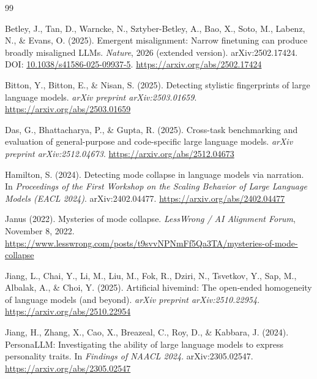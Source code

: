 \documentclass[11pt,a4paper]{article}
\begin{document}

\begin{thebibliography}{99}

Betley, J., Tan, D., Warncke, N., Sztyber-Betley, A., Bao, X., Soto, M., Labenz, N., \& Evans, O. (2025).
\newblock Emergent misalignment: Narrow finetuning can produce broadly misaligned LLMs.
\newblock \emph{Nature}, 2026 (extended version).
\newblock arXiv:2502.17424. DOI: \href{https://doi.org/10.1038/s41586-025-09937-5}{10.1038/s41586-025-09937-5}.
\newblock \url{https://arxiv.org/abs/2502.17424}

Bitton, Y., Bitton, E., \& Nisan, S. (2025).
\newblock Detecting stylistic fingerprints of large language models.
\newblock \emph{arXiv preprint arXiv:2503.01659}.
\newblock \url{https://arxiv.org/abs/2503.01659}

Das, G., Bhattacharya, P., \& Gupta, R. (2025).
\newblock Cross-task benchmarking and evaluation of general-purpose and code-specific large language models.
\newblock \emph{arXiv preprint arXiv:2512.04673}.
\newblock \url{https://arxiv.org/abs/2512.04673}

Hamilton, S. (2024).
\newblock Detecting mode collapse in language models via narration.
\newblock In \emph{Proceedings of the First Workshop on the Scaling Behavior of Large Language Models (EACL 2024)}.
\newblock arXiv:2402.04477.
\newblock \url{https://arxiv.org/abs/2402.04477}

Janus (2022).
\newblock Mysteries of mode collapse.
\newblock \emph{LessWrong / AI Alignment Forum}, November 8, 2022.
\newblock \url{https://www.lesswrong.com/posts/t9svvNPNmFf5Qa3TA/mysteries-of-mode-collapse}

Jiang, L., Chai, Y., Li, M., Liu, M., Fok, R., Dziri, N., Tsvetkov, Y., Sap, M., Albalak, A., \& Choi, Y. (2025).
\newblock Artificial hivemind: The open-ended homogeneity of language models (and beyond).
\newblock \emph{arXiv preprint arXiv:2510.22954}.
\newblock \url{https://arxiv.org/abs/2510.22954}

Jiang, H., Zhang, X., Cao, X., Breazeal, C., Roy, D., \& Kabbara, J. (2024).
\newblock PersonaLLM: Investigating the ability of large language models to express personality traits.
\newblock In \emph{Findings of NAACL 2024}.
\newblock arXiv:2305.02547.
\newblock \url{https://arxiv.org/abs/2305.02547}


\end{thebibliography}
\end{document}
